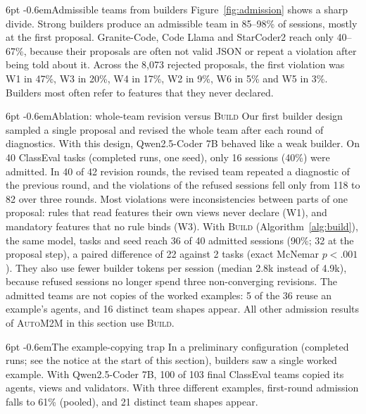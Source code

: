 \documentclass[pdflatex,sn-mathphys-num]{sn-jnl}
\makeatletter
\theoremstyle{thmstyleone}%
\theoremstyle{thmstyletwo}%
\theoremstyle{thmstylethree}%
\newcommand{\auto}{\textsc{AutoM2M}}
\newcommand{\W}[1]{\textsf{W#1}}
\renewcommand\paragraph{\@startsection{paragraph}{4}{\z@}%
  {6pt \@plus 2pt \@minus 1pt}{-0.6em}{\normalfont\normalsize\bfseries}}
\makeatother
\begin{document}
\paragraph{Admissible teams from builders} Figure~\ref{fig:admission} shows a
sharp divide. Strong builders produce an admissible team in 85--98\% of
sessions, mostly at the first proposal. Granite-Code, Code Llama and StarCoder2
reach only 40--67\%, because their proposals are often not valid JSON or
repeat a violation after being told about it. Across the 8{,}073 rejected
proposals, the first violation was \W{1} in 47\%, \W{3} in 20\%, \W{4} in 17\%,
\W{2} in 9\%, \W{6} in 5\% and \W{5} in 3\%. Builders most often refer to
features that they never declared.

\paragraph{Ablation: whole-team revision versus \textsc{Build}} Our first
builder design sampled a single proposal and revised the whole team after each
round of diagnostics. With this design, Qwen2.5-Coder 7B behaved like a weak
builder. On 40 ClassEval tasks (completed runs, one seed), only 16 sessions
(40\%) were admitted. In 40 of 42 revision rounds, the revised team repeated a
diagnostic of the previous round, and the violations of the refused sessions
fell only from 118 to 82 over three rounds. Most violations were
inconsistencies between parts of one proposal: rules that read features their
own views never declare (\W{1}), and mandatory features that no rule binds
(\W{3}). With \textsc{Build} (Algorithm~\ref{alg:build}), the same model, tasks
and seed reach 36 of 40 admitted sessions (90\%; 32 at the proposal step), a
paired difference of 22 against 2 tasks (exact McNemar $p<.001$). They also use
fewer builder tokens per session (median 2.8k instead of 4.9k), because refused
sessions no longer spend three non-converging revisions. The admitted teams
are not copies of the worked examples: 5 of the 36 reuse an example's agents,
and 16 distinct team shapes appear. All other admission results of \auto{} in
this section use \textsc{Build}.

\paragraph{The example-copying trap} In a preliminary configuration (completed
runs; see the notice at the start of this section), builders saw a single
worked example. With Qwen2.5-Coder 7B, 100 of 103 final ClassEval teams copied
its agents, views and validators. With three different examples, first-round
admission falls to 61\% (pooled), and 21 distinct team shapes appear.
\end{document}
